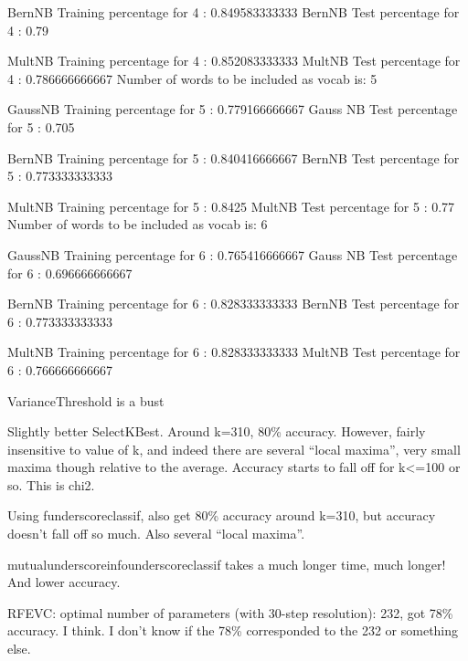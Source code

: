 BernNB Training percentage for 4 : 0.849583333333
BernNB Test percentage for 4 :     0.79

MultNB Training percentage for 4 : 0.852083333333
MultNB Test percentage for 4 :     0.786666666667
Number of words to be included as vocab is: 5

GaussNB Training percentage for 5 : 0.779166666667
Gauss NB Test percentage for 5 :     0.705

BernNB Training percentage for 5 : 0.840416666667
BernNB Test percentage for 5 :     0.773333333333

MultNB Training percentage for 5 : 0.8425
MultNB Test percentage for 5 :     0.77
Number of words to be included as vocab is: 6

GaussNB Training percentage for 6 : 0.765416666667
Gauss NB Test percentage for 6 :     0.696666666667

BernNB Training percentage for 6 : 0.828333333333
BernNB Test percentage for 6 :     0.773333333333

MultNB Training percentage for 6 : 0.828333333333
MultNB Test percentage for 6 :     0.766666666667

VarianceThreshold is a bust

Slightly better SelectKBest.  Around k=310, 80\% accuracy.  However, fairly insensitive to value of k, and indeed there are several ``local maxima'', very small maxima though relative to the average.  Accuracy starts to fall off for k<=100 or so.  This is chi2.

Using funderscoreclassif, also get 80\% accuracy around k=310, but accuracy doesn't fall off so much.  Also several ``local maxima''.

mutualunderscoreinfounderscoreclassif takes a much longer time, much longer!  And lower accuracy.



RFEVC: optimal number of parameters (with 30-step resolution): 232, got 78\% accuracy.  I think.  I don't know if the 78\% corresponded to the 232 or something else.